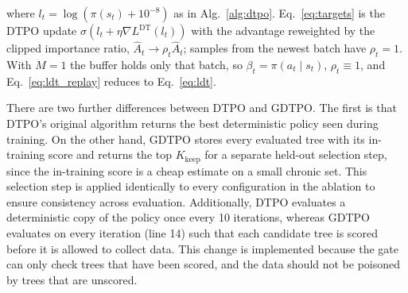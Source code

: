 where $l_t = \log(\pi(s_t) + 10^{-8})$ as in Alg.~\ref{alg:dtpo}. Eq.~\ref{eq:targets} is the DTPO update $\sigma(l_t + \eta \nabla L^{\text{DT}}(l_t))$ with the advantage reweighted by the clipped importance ratio, $\hat{A}_t \rightarrow \rho_t \hat{A}_t$; samples from the newest batch have $\rho_t = 1$. With $M = 1$ the buffer holds only that batch, so $\beta_t = \pi(a_t \mid s_t)$, $\rho_t \equiv 1$, and Eq.~\ref{eq:ldt_replay} reduces to Eq.~\ref{eq:ldt}.


There are two further differences between DTPO and GDTPO. The first is that DTPO's original algorithm returns the best deterministic policy seen during training. On the other hand, GDTPO stores every evaluated tree with its in-training score and returns the top $K_{\text{keep}}$ for a separate held-out selection step, since the in-training score is a cheap estimate on a small chronic set. This selection step is applied identically to every configuration in the ablation to ensure consistency across evaluation. Additionally, DTPO evaluates a deterministic copy of the policy once every 10 iterations, whereas GDTPO evaluates on every iteration (line 14) such that each candidate tree is scored before it is allowed to collect data. This change is implemented because the gate can only check trees that have been scored, and the data should not be poisoned by trees that are unscored.

